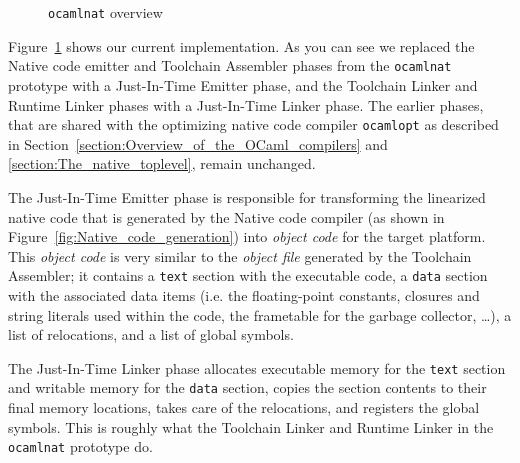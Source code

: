 \documentclass[10pt,a4paper,final,twocolumn]{article}
\makeatletter
\newcommand{\ie}{i.e.\@\xspace}
\makeatother
\begin{document}
\begin{figure}[htb]
  \centering
  \caption{\texttt{ocamlnat} overview}
  \label{fig:ocamlnat_overview}
\end{figure}

Figure~\ref{fig:ocamlnat_overview} shows our current implementation. As you can see we replaced
the Native code emitter and Toolchain Assembler phases from the \texttt{ocamlnat} prototype with
a Just-In-Time Emitter phase, and the Toolchain Linker and Runtime Linker phases with a Just-In-Time
Linker phase. The earlier phases, that are shared with the optimizing native code compiler
\texttt{ocamlopt} as described in Section~\ref{section:Overview_of_the_OCaml_compilers} and
\ref{section:The_native_toplevel}, remain unchanged.

The Just-In-Time Emitter phase is responsible for transforming the linearized native code that is
generated by the Native code compiler (as shown in Figure~\ref{fig:Native_code_generation}) into
\emph{object code} for the target platform. This \emph{object code} is very similar to the \emph{object
file} generated by the Toolchain Assembler; it contains a \texttt{text} section with the executable
code, a \texttt{data} section with the associated data items (\ie the floating-point constants, closures
and string literals used within the code, the frametable for the garbage collector, \ldots), a list
of relocations, and a list of global symbols.

The Just-In-Time Linker phase allocates executable memory for the \texttt{text} section and writable
memory for the \texttt{data} section, copies the section contents to their final memory locations,
takes care of the relocations, and registers the global symbols. This is roughly what the Toolchain
Linker and Runtime Linker in the \texttt{ocamlnat} prototype do.
\end{document}

